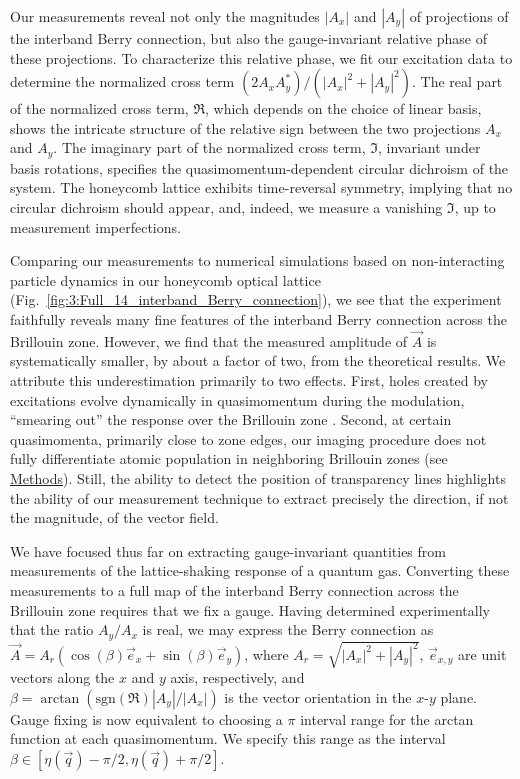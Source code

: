 \documentclass[superscriptaddress, reprint, amsmath, amssymb, aps, prl]{revtex4-2}
\begin{document}
Our measurements reveal not only the magnitudes $|A_x|$ and $|A_y|$ of projections of the interband Berry connection, but also the gauge-invariant relative phase of these projections. To characterize this relative phase, we fit our excitation data to determine the normalized cross term $(2 A_x A_y^*) / (|A_x|^2 + |A_y|^2)$. The real part of the normalized cross term, $\mathfrak{R}$, which depends on the choice of linear basis, shows the intricate structure of the relative sign between the two projections $A_x$ and $A_y$. The imaginary part of the normalized cross term, $\mathfrak{I}$, invariant under basis rotations,
specifies the quasimomentum-dependent circular dichroism of the system. The honeycomb lattice exhibits time-reversal symmetry, implying that no circular dichroism should appear, and, indeed, we measure a vanishing $\mathfrak{I}$, up to measurement imperfections.

Comparing our measurements to numerical simulations based on non-interacting particle dynamics in our honeycomb optical lattice (Fig.\ \ref{fig:3:Full_14_interband_Berry_connection}), we see that the experiment faithfully reveals many fine features of the interband Berry connection across the Brillouin zone. However, we find that the measured amplitude of $\vec{A}$ is systematically smaller, by about a factor of two, from the theoretical results. We attribute this underestimation primarily to two effects. First, holes created by excitations evolve dynamically in quasimomentum during the modulation, ``smearing out'' the response over the Brillouin zone \cite{heinze_intrinsic_2013}. Second, at certain quasimomenta, primarily close to zone edges, our imaging procedure does not fully differentiate atomic population in neighboring Brillouin zones (see \hyperref[sec:methods]{Methods}). 
Still, the ability to detect the position of transparency lines highlights the ability of our measurement technique to  extract precisely the direction, if not the magnitude, of the vector field. 

We have focused thus far on extracting gauge-invariant quantities from measurements of the lattice-shaking response of a quantum gas. Converting these measurements to a full map of the interband Berry connection across the Brillouin zone requires that we fix a gauge.  Having determined experimentally that the ratio $A_y/A_x$ is real, we may express the Berry connection as 
$\vec{A} = A_r (\cos(\beta) \vec{e}_x + \sin(\beta) \vec{e}_y)$, where $A_r = \sqrt{|A_x|^2 + |A_y|^2}$, $\vec{e}_{x,y}$ are unit vectors along the $x$ and $y$ axis, respectively, and $\beta = \arctan( \textrm{sgn}(\mathfrak{R}) |A_y| / |A_x| )$ is the vector orientation in the $x$-$y$ plane.
Gauge fixing is now equivalent to choosing a $\pi$ interval range for the arctan function at each quasimomentum.  We specify this range as the interval $\beta \in [ \eta(\vec{q}) - \pi/2, \eta(\vec{q}) + \pi/2]$.
\end{document}
